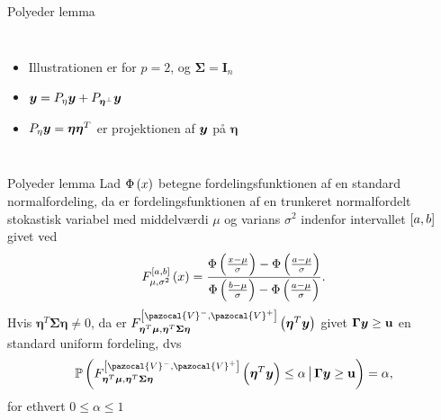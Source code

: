\begin{frame}{Polyeder lemma}
\begin{columns}[c]
\column{1.5in}
\begin{itemize}
\item Illustrationen er for $p = 2$, og $\boldsymbol \Sigma = \textbf{I}_n$
\item $\bm{y} = P_{\eta} \bm{y} + P_{\boldsymbol{\eta}^\perp} \bm{y}$
\item$ P_{\eta} \bm{y} = \boldsymbol \eta \boldsymbol \eta^T $ er projektionen af $\bm{y}$ på $\boldsymbol \eta$
\end{itemize}

\column{2.2in}

 \end{columns}
% 
%
\end{frame}


\begin{frame}{Polyeder lemma}
Lad \(\Phi \del{x}\) betegne fordelingsfunktionen af en standard normalfordeling, da er fordelingsfunktionen af en trunkeret normalfordelt stokastisk variabel med middelværdi \(\mu\) og varians \(\sigma^2\) indenfor intervallet \(\sbr{a,b}\) givet ved
\begin{align*}
F_{\mu, \sigma^2}^{\sbr{a,b}} \del{x} = \frac{\Phi\del{\frac{x-\mu}{\sigma}} - \Phi\del{\frac{a-\mu}{\sigma}}}{\Phi\del{\frac{b-\mu}{\sigma}} - \Phi\del{\frac{a-\mu}{\sigma}}}.
\end{align*}
Hvis \(\boldsymbol{\eta}^T \boldsymbol{\Sigma} \boldsymbol{\eta} \neq 0\), da er \(F_{\boldsymbol{\eta}^T \vmu, \boldsymbol{\eta}^T \boldsymbol{\Sigma} \boldsymbol{\eta}}^{\sbr{\pazocal{V}^-,\pazocal{V}^+}} \del{\boldsymbol{\eta}^T \vy} \) givet \(\boldsymbol{\Gamma} \bm{y} \geq \mathbf{u}\) en standard uniform fordeling, dvs
\begin{align*}
\mathbb{P} \del{F_{\boldsymbol{\eta}^T \vmu, \boldsymbol{\eta}^T \boldsymbol{\Sigma} \boldsymbol{\eta}}^{\sbr{\pazocal{V}^-,\pazocal{V}^+}} \del{\boldsymbol{\eta}^T \vy} \leq \alpha \given \boldsymbol{\Gamma} \vy \geq \mathbf{u}} = \alpha, 
\end{align*}
for ethvert \(0 \leq \alpha \leq 1\)
\end{frame}

